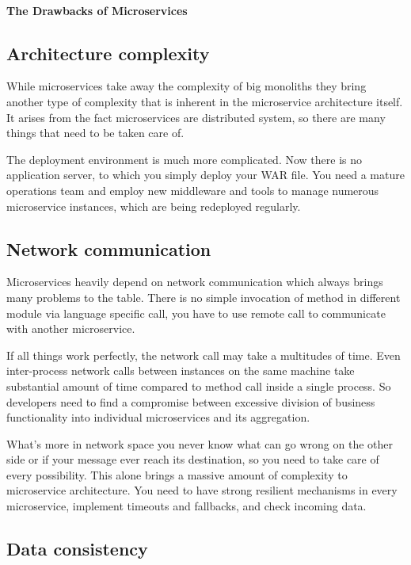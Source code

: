 \documentclass[12pt,oneside]{fithesis2}
\begin{document}
\paragraph{The Drawbacks of Microservices}

\subsection{Architecture complexity}

While microservices take away the complexity of big monoliths they bring another type of complexity that is inherent in the microservice architecture itself. It arises from the fact microservices are distributed system, so there are many things that need to be taken care of.

The deployment environment is much more complicated. Now there is no application server, to which you simply deploy your WAR file. You need a mature operations team and employ new middleware and tools to manage numerous microservice instances, which are being redeployed regularly.

\subsection{Network communication}

Microservices heavily depend on network communication which always brings many problems to the table. There is no simple invocation of method in different module via language specific call, you have to use remote call to communicate with another microservice.

If all things work perfectly, the network call may take a multitudes of time. Even inter-process network calls between instances on the same machine take substantial amount of time compared to method call inside a single process. So developers need to find a compromise between excessive division of business functionality into individual microservices and its aggregation.

What's more in network space you never know what can go wrong on the other side or if your message ever reach its destination, so you need to take care of every possibility. This alone brings a massive amount of complexity to microservice architecture. You need to have strong resilient mechanisms in every microservice, implement timeouts and fallbacks, and check incoming data.

\subsection{Data consistency}
\end{document}

